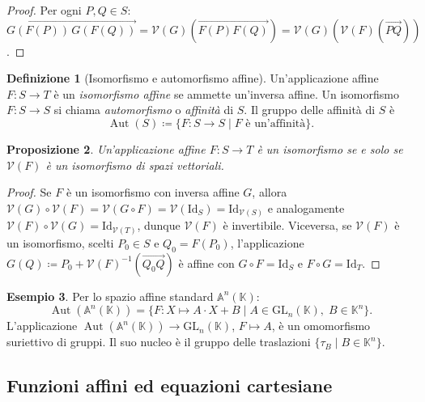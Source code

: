 \documentclass[11pt, a4paper]{book}
\theoremstyle{definition}
\newtheorem{definizione}{Definizione}[section]
\newtheorem{esempio}[definizione]{Esempio}
\theoremstyle{plain}
\newtheorem{proposizione}[definizione]{Proposizione}
\theoremstyle{remark}
\newcommand{\K}{\mathbb{K}}
\newcommand{\Id}{\mathrm{Id}}
\newcommand{\GL}{\mathrm{GL}}
\DeclareMathOperator{\Aut}{Aut}
\newcommand{\VV}{\mathcal{V}}   %
\begin{document}
\begin{proof}
Per ogni $P, Q \in S$: $\overrightarrow{G(F(P))\,G(F(Q))} = \VV(G)(\overrightarrow{F(P)F(Q)}) = \VV(G)(\VV(F)(\overrightarrow{PQ}))$.
\end{proof}

\begin{defbox}
\begin{definizione}[Isomorfismo e automorfismo affine]
Un'applicazione affine $F \colon S \to T$ è un \emph{isomorfismo affine} se ammette un'inversa affine. Un isomorfismo $F \colon S \to S$ si chiama \emph{automorfismo} o \emph{affinità} di $S$. Il gruppo delle affinità di $S$ è
\[
  \Aut(S) \coloneqq \{ F \colon S \to S \mid F \text{ è un'affinità} \}.
\]
\end{definizione}
\end{defbox}

\begin{proposizione}
\label{prop:iso-affine}
Un'applicazione affine $F \colon S \to T$ è un isomorfismo se e solo se $\VV(F)$ è un isomorfismo di spazi vettoriali.
\end{proposizione}

\begin{proof}
Se $F$ è un isomorfismo con inversa affine $G$, allora $\VV(G) \circ \VV(F) = \VV(G \circ F) = \VV(\Id_S) = \Id_{\VV(S)}$ e analogamente $\VV(F) \circ \VV(G) = \Id_{\VV(T)}$, dunque $\VV(F)$ è invertibile. Viceversa, se $\VV(F)$ è un isomorfismo, scelti $P_0 \in S$ e $Q_0 = F(P_0)$, l'applicazione $G(Q) \coloneqq P_0 + \VV(F)^{-1}(\overrightarrow{Q_0Q})$ è affine con $G \circ F = \Id_S$ e $F \circ G = \Id_T$.
\end{proof}

\begin{exbox}
\begin{esempio}
Per lo spazio affine standard $\mathbb{A}^n(\K)$:
\[
  \Aut(\mathbb{A}^n(\K)) = \{ F \colon X \mapsto A \cdot X + B \mid A \in \GL_n(\K),\; B \in \K^n \}.
\]
L'applicazione $\Aut(\mathbb{A}^n(\K)) \to \GL_n(\K)$, $F \mapsto A$, è un omomorfismo suriettivo di gruppi. Il suo nucleo è il gruppo delle traslazioni $\{\tau_B \mid B \in \K^n\}$.
\end{esempio}
\end{exbox}

\subsection{Funzioni affini ed equazioni cartesiane}
\end{document}
